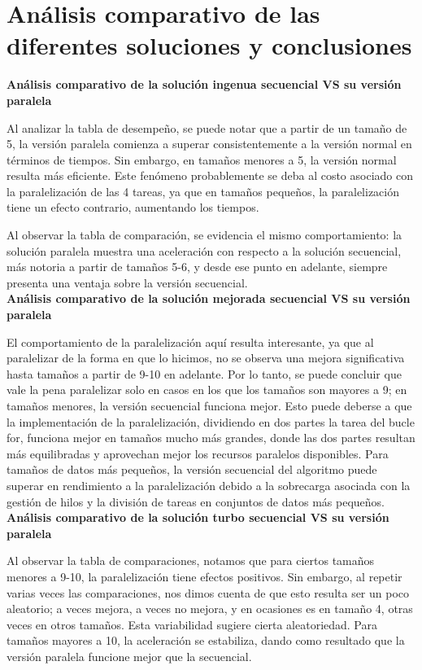 \documentclass[conference]{IEEEtran}
\begin{document}
\section{\textbf{Análisis comparativo de las diferentes soluciones y conclusiones}}



\textbf{Análisis comparativo de la solución ingenua secuencial VS su versión paralela}

Al analizar la tabla de desempeño, se puede notar que a partir de un tamaño de 5, la versión paralela comienza a superar consistentemente a la versión normal en términos de tiempos. Sin embargo, en tamaños menores a 5, la versión normal resulta más eficiente. Este fenómeno probablemente se deba al costo asociado con la paralelización de las 4 tareas, ya que en tamaños pequeños, la paralelización tiene un efecto contrario, aumentando los tiempos.

Al observar la tabla de comparación, se evidencia el mismo comportamiento: la solución paralela muestra una aceleración con respecto a la solución secuencial, más notoria a partir de tamaños 5-6, y desde ese punto en adelante, siempre presenta una ventaja sobre la versión secuencial.\\


\textbf{Análisis comparativo de la solución mejorada secuencial VS su versión paralela}

El comportamiento de la paralelización aquí resulta interesante, ya que al paralelizar de la forma en que lo hicimos, no se observa una mejora significativa hasta tamaños a partir de 9-10 en adelante. Por lo tanto, se puede concluir que vale la pena paralelizar solo en casos en los que los tamaños son mayores a 9; en tamaños menores, la versión secuencial funciona mejor. Esto puede deberse a que la implementación de la paralelización, dividiendo en dos partes la tarea del bucle for, funciona mejor en tamaños mucho más grandes, donde las dos partes resultan más equilibradas y aprovechan mejor los recursos paralelos disponibles. Para tamaños de datos más pequeños, la versión secuencial del algoritmo puede superar en rendimiento a la paralelización debido a la sobrecarga asociada con la gestión de hilos y la división de tareas en conjuntos de datos más pequeños.\\


\textbf{Análisis comparativo de la solución turbo secuencial VS su versión paralela}

Al observar la tabla de comparaciones, notamos que para ciertos tamaños menores a 9-10, la paralelización tiene efectos positivos. Sin embargo, al repetir varias veces las comparaciones, nos dimos cuenta de que esto resulta ser un poco aleatorio; a veces mejora, a veces no mejora, y en ocasiones es en tamaño 4, otras veces en otros tamaños. Esta variabilidad sugiere cierta aleatoriedad. Para tamaños mayores a 10, la aceleración se estabiliza, dando como resultado que la versión paralela funcione mejor que la secuencial.\\
\end{document}
